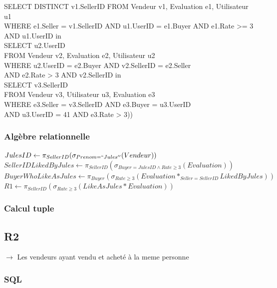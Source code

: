 \documentclass[a4paper,11pt]{article}
\begin{document}
SELECT DISTINCT v1.SellerID
FROM Vendeur v1, Evaluation e1, Utilisateur u1\\
WHERE e1.Seller = v1.SellerID AND u1.UserID = e1.Buyer AND e1.Rate >= 3 AND u1.UserID in \\
\indent \indent SELECT u2.UserID \\
\indent \indent FROM Vendeur v2, Evaluation e2, Utilisateur u2 \\
\indent \indent WHERE u2.UserID = e2.Buyer AND v2.SellerID = e2.Seller \\
\indent \indent AND e2.Rate > 3 AND v2.SellerID in \\
\indent \indent \indent \indent SELECT v3.SellerID\\
\indent \indent \indent \indent FROM Vendeur v3, Utilisateur u3, Evaluation e3\\
\indent \indent \indent \indent WHERE e3.Seller = v3.SellerID AND e3.Buyer = u3.UserID\\
\indent \indent \indent \indent AND u3.UserID = 41 AND e3.Rate > 3))

\subsubsection{Algèbre relationnelle}
$JulesID \leftarrow \pi_{SellerID} ( \sigma_{Prenom=``Jules''} (Vendeur)) $ \\
$SellerIDLikedByJules \leftarrow \pi_{SellerID}(\sigma_{Buyer=JulesID \wedge Rate \geq 3} (Evaluation))$\\
$BuyerWhoLikeAsJules \leftarrow \pi_{Buyer}(\sigma_{Rate \geq 3}(Evaluation *_{Seller=SellerID} LikedByJules))$\\
$R1 \leftarrow \pi_{SellerID}(\sigma_{Rate \geq 3}(LikeAsJules*Evaluation))$

\subsubsection{Calcul tuple}

\subsection{R2}

$\rightarrow$ Les vendeurs ayant vendu et acheté à la meme personne



\subsubsection{SQL}
\end{document}

